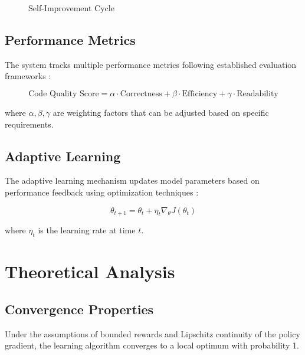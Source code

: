 \documentclass[11pt,a4paper]{article}
\begin{document}
\begin{figure}[H]
\centering

\caption{Self-Improvement Cycle}
\label{fig:self_improvement}
\end{figure}

\subsection{Performance Metrics}

The system tracks multiple performance metrics following established evaluation frameworks \cite{chen2021evaluating}:

\begin{equation}
\text{Code Quality Score} = \alpha \cdot \text{Correctness} + \beta \cdot \text{Efficiency} + \gamma \cdot \text{Readability}
\end{equation}

where $\alpha, \beta, \gamma$ are weighting factors that can be adjusted based on specific requirements.

\subsection{Adaptive Learning}

The adaptive learning mechanism updates model parameters based on performance feedback using optimization techniques \cite{kingma2014adam}:

\begin{equation}
\theta_{t+1} = \theta_t + \eta_t \nabla_{\theta} J(\theta_t)
\end{equation}

where $\eta_t$ is the learning rate at time $t$.

\section{Theoretical Analysis}

\subsection{Convergence Properties}

\begin{theorem}
Under the assumptions of bounded rewards and Lipschitz continuity of the policy gradient, the learning algorithm converges to a local optimum with probability 1.
\end{theorem}
\end{document}
